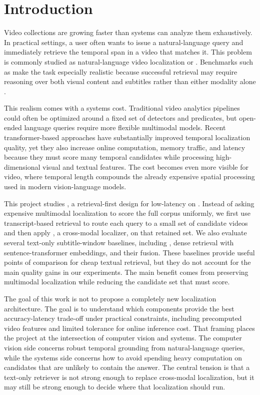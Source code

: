 \section{Introduction}
\label{sec:introduction}

Video collections are growing faster than systems can analyze them exhaustively. In practical settings, a user often wants to issue a natural-language query and immediately retrieve the temporal span in a video that matches it. This problem is commonly studied as natural-language video localization or \task. Benchmarks such as \dataset make the task especially realistic because successful retrieval may require reasoning over both visual content and subtitles rather than either modality alone \cite{lei2020tvr}.

This realism comes with a systems cost. Traditional video analytics pipelines could often be optimized around a fixed set of detectors and predicates, but open-ended language queries require more flexible multimodal models. Recent transformer-based approaches have substantially improved temporal localization quality, yet they also increase online computation, memory traffic, and latency because they must score many temporal candidates while processing high-dimensional visual and textual features. The cost becomes even more visible for video, where temporal length compounds the already expensive spatial processing used in modern vision-language models.

This project studies \system, a retrieval-first design for low-latency \task on \dataset. Instead of asking expensive multimodal localization to score the full corpus uniformly, we first use transcript-based retrieval to route each query to a small set of candidate videos and then apply \xml, a cross-modal localizer, on that retained set. We also evaluate several text-only subtitle-window baselines, including \bm, dense retrieval with sentence-transformer embeddings, and their fusion. These baselines provide useful points of comparison for cheap textual retrieval, but they do not account for the main quality gains in our experiments. The main benefit comes from preserving multimodal localization while reducing the candidate set that \xml must score.

The goal of this work is not to propose a completely new localization architecture. The goal is to understand which components provide the best accuracy-latency trade-off under practical constraints, including precomputed video features and limited tolerance for online inference cost. That framing places the project at the intersection of computer vision and systems. The computer vision side concerns robust temporal grounding from natural-language queries, while the systems side concerns how to avoid spending heavy computation on candidates that are unlikely to contain the answer. The central tension is that a text-only retriever is not strong enough to replace cross-modal localization, but it may still be strong enough to decide where that localization should run.

